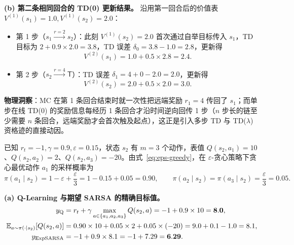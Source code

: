 \textbf{(b) 第二条相同回合的 TD(0) 更新结果。} 沿用第一回合后的价值表 $V^{(1)}(s_1) = 1.0, V^{(1)}(s_2) = 2.0$：
\begin{itemize}
  \item 第 1 步（$s_1 \xrightarrow{r=2} s_2$）：此刻 $V^{(1)}(s_2) = 2.0$ 首次通过自举目标传入 $s_1$，TD 目标为 $2 + 0.9 \times 2.0 = 3.8$，TD 误差 $\delta_0 = 3.8 - 1.0 = 2.8$，更新得
  \[
    V^{(2)}(s_1) = 1.0 + 0.5 \times 2.8 = \mathbf{2.4}.
  \]
  \item 第 2 步（$s_2 \xrightarrow{r=4} \mathsf{T}$）：TD 误差 $\delta_1 = 4 + 0 - 2.0 = 2.0$，更新得
  \[
    V^{(2)}(s_2) = 2.0 + 0.5 \times 2.0 = \mathbf{3.0}.
  \]
\end{itemize}
\textbf{物理洞察}：MC 在第 1 条回合结束时就一次性把远端奖励 $r_1 = 4$ 传回了 $s_1$；而单步在线 TD(0) 的奖励信息每经历 1 条回合才沿时间逆向回传 1 步（$n$ 步长的链至少需要 $n$ 条回合，远端奖励才会首次触及起点），这正是引入多步 TD 与 TD($\lambda$) 资格迹的直接动因。


已知 $r_t = -1, \gamma = 0.9, \varepsilon = 0.15$，状态 $s_2$ 有 $m = 3$ 个动作，表值 $Q(s_2, a_1) = 10$、$Q(s_2, a_2) = 2$、$Q(s_2, a_3) = -20$。由式~\eqref{eq:eps-greedy}，在 $\varepsilon$-贪心策略下贪心最优动作 $a_1$ 的采样概率为
\[
  \pi(a_1 \mid s_2) = 1 - \varepsilon + \frac{\varepsilon}{3} = 1 - 0.15 + 0.05 = 0.90, \qquad
  \pi(a_2 \mid s_2) = \pi(a_3 \mid s_2) = \frac{\varepsilon}{3} = 0.05.
\]

\textbf{(a) Q-Learning 与期望 SARSA 的精确目标值。}
\begin{align*}
  y_{\mathrm{Q}} &= r_t + \gamma \max_{a \in \{a_1, a_2, a_3\}} Q(s_2, a) = -1 + 0.9 \times 10 = \mathbf{8.0}, \\
  \mathbb{E}_{a \sim \pi(\cdot \mid s_2)}[Q(s_2, a)] &= 0.90 \times 10 + 0.05 \times 2 + 0.05 \times (-20) = 9.0 + 0.1 - 1.0 = 8.1, \\
  y_{\mathrm{ExpSARSA}} &= -1 + 0.9 \times 8.1 = -1 + 7.29 = \mathbf{6.29}.
\end{align*}

